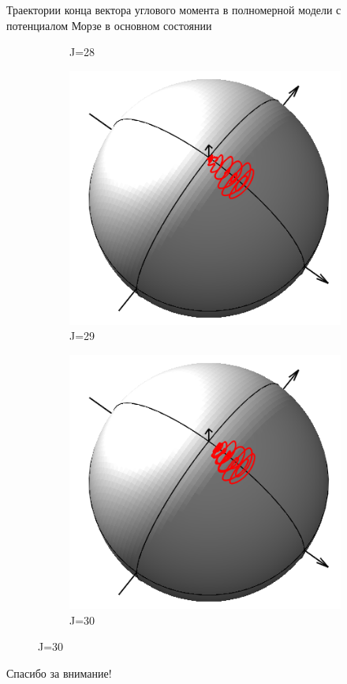 \documentclass[hyperref={pdfpagelabels=false},usepdftitle=false, xcolor = dvipsnames]{beamer}
\begin{document}
\begin{frame}{\small Траектории конца вектора углового момента в полномерной модели с потенциалом Морзе в основном состоянии}
\begin{block}{}
\begin{figure}
\begin{subfigure}{0.25\textwidth}
	    \caption{J=28}
	  \end{subfigure}
	  \begin{subfigure}{0.25\textwidth}
	    \includegraphics[width = \linewidth]{../pictures/MorseGroundState00/plot_J=29.png}
	    \caption{J=29}
	  \end{subfigure}
	  \begin{subfigure}{0.25\textwidth}
	    \includegraphics[width = \linewidth]{../pictures/MorseGroundState00/plot_J=30.png}
	    \caption{J=30}
	  \end{subfigure}
	 \end{figure}
  \end{block}
\end{frame}

\begin{frame}{}
\begin{center}
\Huge Спасибо за внимание!
\end{center}
\end{frame}
\end{document}
